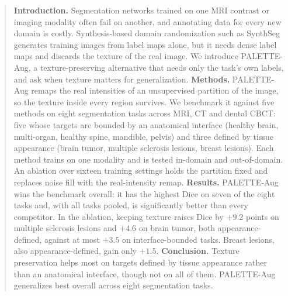 \begin{abstract}
\textbf{Introduction.} Segmentation networks trained on one MRI contrast or
imaging modality often fail on another, and annotating data for every new
domain is costly. Synthesis-based domain randomization such as SynthSeg
generates training images from label maps alone, but it needs dense label maps
and discards the texture of the real image. We introduce PALETTE-Aug, a
texture-preserving alternative that needs only the task's own labels, and ask
when texture matters for generalization.
\textbf{Methods.} PALETTE-Aug remaps the real intensities of an unsupervised
partition of the image, so the texture inside every region survives. We
benchmark it against five methods on eight segmentation tasks across MRI, CT
and dental CBCT: five whose targets are bounded by an anatomical interface
(healthy brain, multi-organ, healthy spine, mandible, pelvis) and three defined
by tissue appearance (brain tumor, multiple sclerosis lesions, breast lesions).
Each method trains on one modality and is tested in-domain and out-of-domain.
An ablation over sixteen training settings holds the partition fixed and
replaces noise fill with the real-intensity remap.
\textbf{Results.} PALETTE-Aug wins the benchmark overall: it has the highest
Dice on seven of the eight tasks and, with all tasks pooled, is significantly
better than every competitor. In the ablation, keeping texture raises Dice by
$+9.2$ points on multiple sclerosis lesions and $+4.6$ on brain tumor, both
appearance-defined, against at most $+3.5$ on interface-bounded tasks. Breast
lesions, also appearance-defined, gain only $+1.5$.
\textbf{Conclusion.} Texture preservation helps most on targets defined by
tissue appearance rather than an anatomical interface, though not on all of
them. PALETTE-Aug generalizes best overall across eight segmentation tasks.
\end{abstract}
